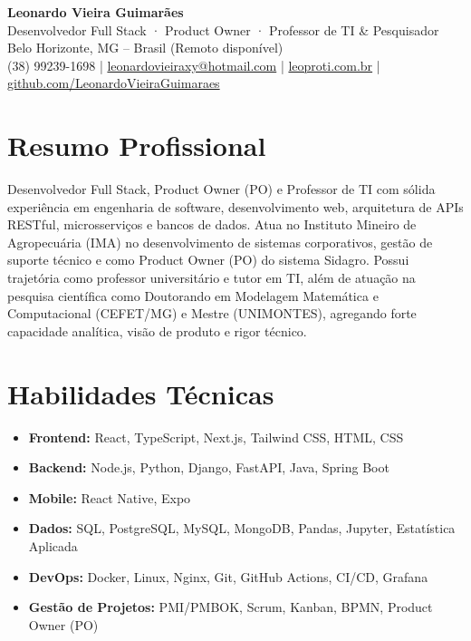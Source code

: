 \documentclass[a4paper,10pt]{article}
\begin{document}
\begin{center}
    {\LARGE \textbf{Leonardo Vieira Guimarães}} \\[4pt]
    Desenvolvedor Full Stack · Product Owner · Professor de TI \& Pesquisador \\[4pt]
    Belo Horizonte, MG -- Brasil (Remoto disponível) \\[4pt]
    (38) 99239-1698 \quad | \quad
    \href{mailto:leonardovieiraxy@hotmail.com}{leonardovieiraxy@hotmail.com} \quad | \quad
    \href{https://leoproti.com.br}{leoproti.com.br} \quad | \quad
    \href{https://github.com/LeonardoVieiraGuimaraes}{github.com/LeonardoVieiraGuimaraes}
\end{center}

\section*{Resumo Profissional}
Desenvolvedor Full Stack, Product Owner (PO) e Professor de TI com sólida experiência em engenharia de software, desenvolvimento web, arquitetura de APIs RESTful, microsserviços e bancos de dados. Atua no Instituto Mineiro de Agropecuária (IMA) no desenvolvimento de sistemas corporativos, gestão de suporte técnico e como Product Owner (PO) do sistema Sidagro. Possui trajetória como professor universitário e tutor em TI, além de atuação na pesquisa científica como Doutorando em Modelagem Matemática e Computacional (CEFET/MG) e Mestre (UNIMONTES), agregando forte capacidade analítica, visão de produto e rigor técnico.

\section*{Habilidades Técnicas}
\begin{itemize}[leftmargin=*]
    \item \textbf{Frontend:} React, TypeScript, Next.js, Tailwind CSS, HTML, CSS
    \item \textbf{Backend:} Node.js, Python, Django, FastAPI, Java, Spring Boot
    \item \textbf{Mobile:} React Native, Expo
    \item \textbf{Dados:} SQL, PostgreSQL, MySQL, MongoDB, Pandas, Jupyter, Estatística Aplicada
    \item \textbf{DevOps:} Docker, Linux, Nginx, Git, GitHub Actions, CI/CD, Grafana
    \item \textbf{Gestão de Projetos:} PMI/PMBOK, Scrum, Kanban, BPMN, Product Owner (PO)
\end{itemize}
\end{document}
